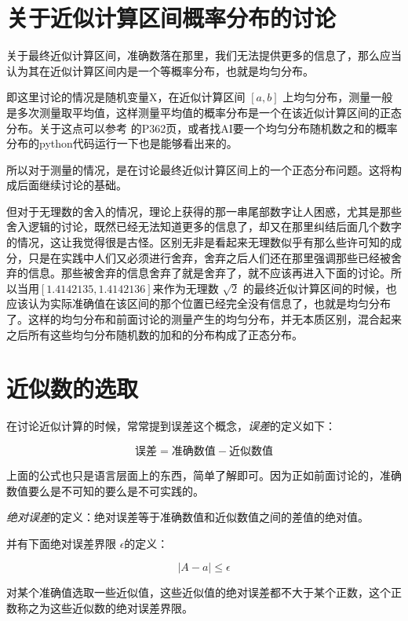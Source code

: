 \documentclass[12pt,oneside]{book}
\providecommand{\abs}[1]{\lvert#1\rvert}
\begin{document}
\section{关于近似计算区间概率分布的讨论}
关于最终近似计算区间，准确数落在那里，我们无法提供更多的信息了，那么应当认为其在近似计算区间内是一个等概率分布，也就是均匀分布。

即这里讨论的情况是随机变量X，在近似计算区间 $ [a, b] $ 上均匀分布，测量一般是多次测量取平均值，这样测量平均值的概率分布是一个在该近似计算区间的正态分布。关于这点可以参考\cite{普林斯顿概率论读本} 的P362页，或者找AI要一个均匀分布随机数之和的概率分布的python代码运行一下也是能够看出来的。

所以对于测量的情况，是在讨论最终近似计算区间上的一个正态分布问题。这将构成后面继续讨论的基础。

但对于无理数的舍入的情况，理论上获得的那一串尾部数字让人困惑，尤其是那些舍入逻辑的讨论，既然已经无法知道更多的信息了，却又在那里纠结后面几个数字的情况，这让我觉得很是古怪。区别无非是看起来无理数似乎有那么些许可知的成分，只是在实践中人们又必须进行舍弃，舍弃之后人们还在那里强调那些已经被舍弃的信息。那些被舍弃的信息舍弃了就是舍弃了，就不应该再进入下面的讨论。所以当用$ [1.4142135, 1.4142136] $来作为无理数 $\sqrt{2}$ 的最终近似计算区间的时候，也应该认为实际准确值在该区间的那个位置已经完全没有信息了，也就是均匀分布了。这样的均匀分布和前面讨论的测量产生的均匀分布，并无本质区别，混合起来之后所有这些均匀分布随机数的加和的分布构成了正态分布。



\section{近似数的选取}
在讨论近似计算的时候，常常提到误差这个概念，\emph{误差}的定义如下：

\begin{equation*}
\text{误差} = \text{准确数值} - \text{近似数值}
\end{equation*}

上面的公式也只是语言层面上的东西，简单了解即可。因为正如前面讨论的，准确数值要么是不可知的要么是不可实践的。

\emph{绝对误差}的定义：绝对误差等于准确数值和近似数值之间的差值的绝对值。

并有下面绝对误差界限 $ \epsilon $的定义：

\begin{equation}
\abs{A - a} \leqslant \epsilon
\end{equation}

对某个准确值选取一些近似值，这些近似值的绝对误差都不大于某个正数，这个正数称之为这些近似数的绝对误差界限。
\end{document}
